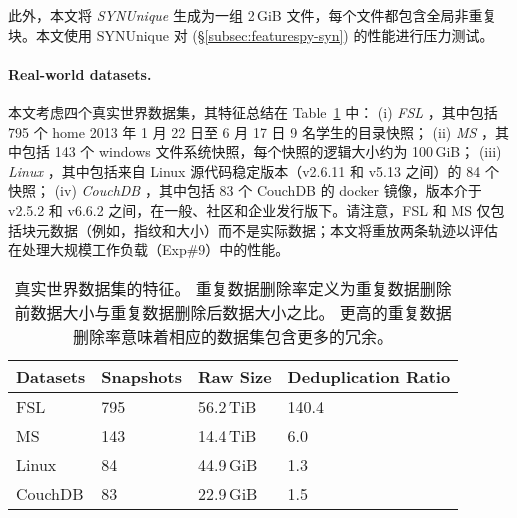 此外，本文将 {\em SYNUnique} 生成为一组 2\,GiB 文件，每个文件都包含全局非重复块。本文使用 SYNUnique 对 \prototype (\S\ref{subsec:featurespy-syn}) 的性能进行压力测试。

\paragraph*{Real-world datasets.} 本文考虑四个真实世界数据集，其特征总结在 Table~\ref{tab:featurespy-datasets} 中： (i) {\em FSL} \cite{fsl}，其中包括 795 个 home 2013 年 1 月 22 日至 6 月 17 日 9 名学生的目录快照； (ii) {\em MS} \cite{meyer11}，其中包括 143 个 windows 文件系统快照，每个快照的逻辑大小约为 100\,GiB； (iii) {\em Linux} \cite{linux}，其中包括来自 Linux 源代码稳定版本（v2.6.11 和 v5.13 之间）的 84 个快照； (iv) {\em CouchDB} \cite{couchdb}，其中包括 83 个 CouchDB 的 docker 镜像，版本介于 v2.5.2 和 v6.6.2 之间，在一般、社区和企业发行版下。请注意，FSL 和 MS 仅包括块元数据（例如，指纹和大小）而不是实际数据；本文将重放两条轨迹以评估 \prototype 在处理大规模工作负载（Exp\#9）中的性能。

\begin{table}
  \centering
  \small
  \begin{tabular}{|l|l|l|l|}
    \hline
    {\bf Datasets} & {\bf Snapshots} & {\bf Raw Size} & {\bf Deduplication Ratio} \\
    \hline
    \hline
    FSL & 795 & 56.2\,TiB & 140.4 \\
    \hline
    MS & 143 & 14.4\,TiB & 6.0 \\
    \hline
    Linux & 84 & 44.9\,GiB & 1.3 \\
    \hline
    CouchDB & 83 & 22.9\,GiB & 1.5 \\
    \hline
  \end{tabular}
  \caption{真实世界数据集的特征。 重复数据删除率定义为重复数据删除前数据大小与重复数据删除后数据大小之比。 更高的重复数据删除率意味着相应的数据集包含更多的冗余。}
  \vspace{-6pt}
  \label{tab:featurespy-datasets}
\end{table}
